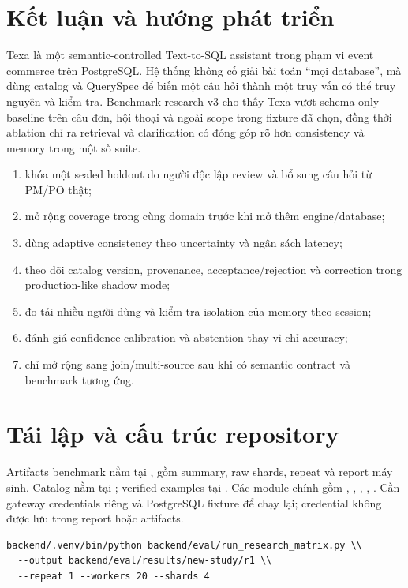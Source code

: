 \documentclass[11pt,a4paper]{article}
\begin{document}
\section{Kết luận và hướng phát triển}
Texa là một semantic-controlled Text-to-SQL assistant trong phạm vi event commerce trên PostgreSQL. Hệ thống không cố giải bài toán ``mọi database'', mà dùng catalog và QuerySpec để biến một câu hỏi thành một truy vấn có thể truy nguyên và kiểm tra. Benchmark research-v3 cho thấy Texa vượt schema-only baseline trên câu đơn, hội thoại và ngoài scope trong fixture đã chọn, đồng thời ablation chỉ ra retrieval và clarification có đóng góp rõ hơn consistency và memory trong một số suite.
\begin{enumerate}
\item khóa một sealed holdout do người độc lập review và bổ sung câu hỏi từ PM/PO thật;
\item mở rộng coverage trong cùng domain trước khi mở thêm engine/database;
\item dùng adaptive consistency theo uncertainty và ngân sách latency;
\item theo dõi catalog version, provenance, acceptance/rejection và correction trong production-like shadow mode;
\item đo tải nhiều người dùng và kiểm tra isolation của memory theo session;
\item đánh giá confidence calibration và abstention thay vì chỉ accuracy;
\item chỉ mở rộng sang join/multi-source sau khi có semantic contract và benchmark tương ứng.
\end{enumerate}

\appendix\section{Tái lập và cấu trúc repository}
Artifacts benchmark nằm tại , gồm summary, raw shards, repeat và report máy sinh. Catalog nằm tại ; verified examples tại . Các module chính gồm , , , , . Cần gateway credentials riêng và PostgreSQL fixture để chạy lại; credential không được lưu trong report hoặc artifacts.
\begin{lstlisting}
backend/.venv/bin/python backend/eval/run_research_matrix.py \\
  --output backend/eval/results/new-study/r1 \\
  --repeat 1 --workers 20 --shards 4
\end{lstlisting}
\end{document}

